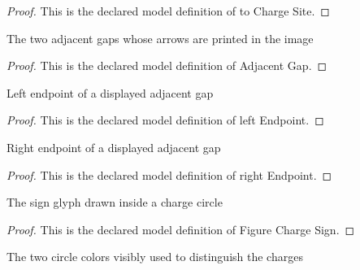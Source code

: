 \begin{proof}
  This is the declared model definition of to Charge Site.
\end{proof}
\begin{definition}
  \label{def:physics:phyx-mini-0892:phyxminiproblems-problemphyxmini0892-adjacentgap}
  The two adjacent gaps whose arrows are printed in the image
\end{definition}
\begin{proof}
  This is the declared model definition of Adjacent Gap.
\end{proof}
\begin{definition}
  \label{def:physics:phyx-mini-0892:phyxminiproblems-problemphyxmini0892-adjacentgap-leftendpoint}
  Left endpoint of a displayed adjacent gap
\end{definition}
\begin{proof}
  This is the declared model definition of left Endpoint.
\end{proof}
\begin{definition}
  \label{def:physics:phyx-mini-0892:phyxminiproblems-problemphyxmini0892-adjacentgap-rightendpoint}
  Right endpoint of a displayed adjacent gap
\end{definition}
\begin{proof}
  This is the declared model definition of right Endpoint.
\end{proof}
\begin{definition}
  \label{def:physics:phyx-mini-0892:phyxminiproblems-problemphyxmini0892-figurechargesign}
  The sign glyph drawn inside a charge circle
\end{definition}
\begin{proof}
  This is the declared model definition of Figure Charge Sign.
\end{proof}
\begin{definition}
  \label{def:physics:phyx-mini-0892:phyxminiproblems-problemphyxmini0892-figurechargecolor}
  The two circle colors visibly used to distinguish the charges
\end{definition}
